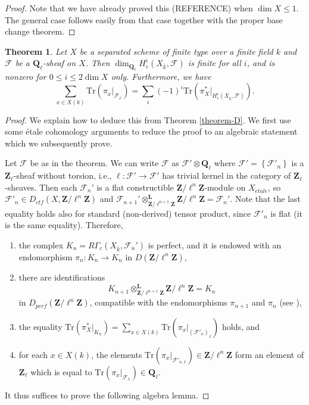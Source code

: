 \documentclass{stacks-project}
\theoremstyle{plain}
\newtheorem{theorem}[subsection]{Theorem}
\theoremstyle{definition}
\theoremstyle{remark}
\numberwithin{equation}{subsection}
\def\etale{{\acute{e}tale}}
\begin{document}
\begin{proof}
Note that we have already proved this (REFERENCE) when $\dim X \leq 1$. The
general case follows easily from that case together with the proper base change
theorem.
\end{proof}

\begin{theorem}
\label{theorem-C}
Let $X$ be a separated scheme of finite type over a finite field $k$ and
$\mathcal{F}$ be a $\mathbf{Q}_\ell$-sheaf on $X$. Then
$\dim_{\mathbf{Q}_\ell}H_c^i(X_{\bar k}, \mathcal{F})$ is finite for all $i$,
and is nonzero for $0\leq i \leq 2 \dim X$ only. Furthermore, we have
$$
\sum_{x\in X(k)} \text{Tr}\left(\pi_x |_{\mathcal{F}_{\bar x}}\right) =
\sum_i (-1)^i\text{Tr}\left(\pi_X^* |_{H_c^i(X_{\bar k}, \mathcal{F})}\right).
$$
\end{theorem}

\begin{proof}
We explain how to deduce this from Theorem \ref{theorem-D}.
We first use some \'etale cohomology arguments to reduce the proof
to an algebraic statement which we subsequently prove.

\medskip\noindent
Let $\mathcal{F}$ be as in the theorem. We can write
$\mathcal{F}$ as
$\mathcal{F}'\otimes \mathbf{Q}_\ell$ where $\mathcal{F}' =
\left\{\mathcal{F}'_n\right\}$ is a $\mathbf{Z}_\ell$-sheaf without torsion,
i.e., $\ell : \mathcal{F}'\to \mathcal{F}'$ has trivial kernel in the
category of $\mathbf{Z}_\ell$-sheaves. Then each $\mathcal{F}_n'$ is a flat
constructible $\mathbf{Z}/\ell^n\mathbf{Z}$-module on $X_\etale$, so
$\mathcal{F}'_n \in D_{ctf}(X, \mathbf{Z}/\ell^n\mathbf{Z})$ and
$\mathcal{F}_{n+1}'
\otimes^{\mathbf{L}}_{\mathbf{Z}/\ell^{n+1}\mathbf{Z}}
\mathbf{Z}/\ell^n\mathbf{Z} = \mathcal{F}_n'$.
Note that the last equality holds also
for standard (non-derived) tensor product, since $\mathcal{F}'_n$ is flat
(it is the same equality). Therefore,
\begin{enumerate}
\item
the complex $K_n = R\Gamma_c\left(X_{\bar k}, \mathcal{F}_n'\right)$ is perfect,
and it is endowed with an endomorphism $\pi_n : K_n\to K_n$ in
$D(\mathbf{Z}/\ell^n\mathbf{Z})$,
\item
there are identifications
$$
K_{n+1}
\otimes^{\mathbf{L}}_{\mathbf{Z}/\ell^{n+1}\mathbf{Z}}
\mathbf{Z}/\ell^n\mathbf{Z}
=
K_n
$$
in $D_{perf}(\mathbf{Z}/\ell^n\mathbf{Z})$, compatible with the endomorphisms
$\pi_{n+1}$ and $\pi_n$ (see \cite[Rapport 4.12]{SGA4.5}),
\item
the equality $\text{Tr}\left(\pi_X^* |_{K_n}\right) =
\sum_{x\in X(k)} \text{Tr}\left(\pi_x |_{(\mathcal{F}'_n)_{\bar x}}\right)$
holds, and
\item
for each $x\in X(k)$, the elements
$\text{Tr}(\pi_x |_{\mathcal{F}'_{n, \bar x}}) \in \mathbf{Z}/\ell^n\mathbf{Z}$
form an element of
$\mathbf{Z}_\ell$ which is equal to
$\text{Tr}(\pi_x |_{\mathcal{F}_{\bar x}}) \in \mathbf{Q}_\ell$.
\end{enumerate}
It thus suffices to prove the following algebra lemma.
\end{proof}
\end{document}
